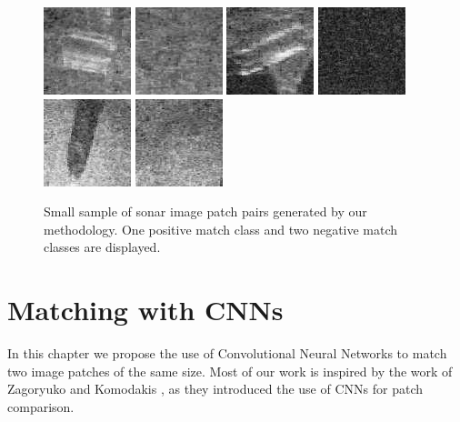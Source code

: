 \begin{figure}
{{			\includegraphics[width=0.11 \textwidth]{chapters/images/matching/non-match-bg32877-A.jpg}
			\includegraphics[width=0.11 \textwidth]{chapters/images/matching/non-match-bg32877-B.jpg} \;
			\includegraphics[width=0.11 \textwidth]{chapters/images/matching/non-match-bg75168-A.jpg}
			\includegraphics[width=0.11 \textwidth]{chapters/images/matching/non-match-bg75168-B.jpg} \;
			\includegraphics[width=0.11 \textwidth]{chapters/images/matching/non-match-bg90705-A.jpg}
			\includegraphics[width=0.11 \textwidth]{chapters/images/matching/non-match-bg90705-B.jpg}
		}
	}
	\vspace*{0.5cm}
	\caption[Small sample of sonar image patch pairs generated by our methodology]{Small sample of sonar image patch pairs generated by our methodology. One positive match class and two negative match classes are displayed.}
	\label{mat:datasetPatchSamples}
\end{figure}

\FloatBarrier
\section{Matching with CNNs}

In this chapter we propose the use of Convolutional Neural Networks to match two image patches of the same size. Most of our work is inspired by the work of Zagoryuko and Komodakis \cite{zagoruyko2015learning}, as they introduced the use of CNNs for patch comparison. 

